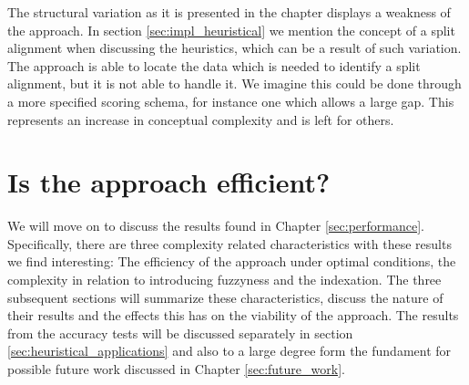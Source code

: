 \documentclass[thesis.tex]{subfiles}
\begin{document}
\par\noindent
The structural variation as it is presented in the chapter displays a weakness of the approach. In section \ref{sec:impl_heuristical} we mention the concept of a split alignment when discussing the heuristics, which can be a result of such variation. The approach is able to locate the data which is needed to identify a split alignment, but it is not able to handle it. We imagine this could be done through a more specified scoring schema, for instance one which allows a large gap. This represents an increase in conceptual complexity and is left for others.
\section{Is the approach efficient?}
We will move on to discuss the results found in Chapter \ref{sec:performance}. Specifically, there are three complexity related characteristics with these results we find interesting: The efficiency of the approach under optimal conditions, the complexity in relation to introducing fuzzyness and the indexation. The three subsequent sections will summarize these characteristics, discuss the nature of their results and the effects this has on the viability of the approach. The results from the accuracy tests will be discussed separately in section \ref{sec:heuristical_applications} and also to a large degree form the fundament for possible future work discussed in Chapter \ref{sec:future_work}.
\end{document}

